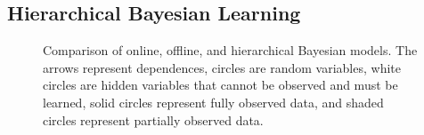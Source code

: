\subsection{Hierarchical Bayesian Learning}
\label{sec:framework:HBM}

\begin{figure}

  \caption{ Comparison of online, offline, and hierarchical Bayesian
     models.  The arrows represent dependences, circles are random
     variables, white circles are hidden variables that cannot be
     observed and must be learned, solid circles represent fully
     observed data, and shaded circles represent partially observed
     data.}
\label{fig:learning-models}
\end{figure}
